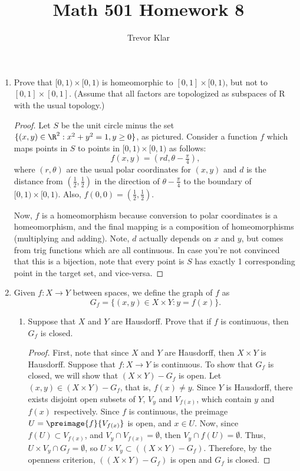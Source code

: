 \documentclass[letterpaper]{article}
\title{Math 501 \linebreak
Homework 8}
\author{Trevor Klar}
\begin{document}
\maketitle

\begin{enumerate}
\item Prove that $[0,1)\times[0,1)$ is homeomorphic to $[0,1]\times[0,1)$, but not to $[0,1]\times[0,1]$. (Assume that all factors
are topologized as subspaces of R with the usual topology.)

\begin{proof}
Let $S$ be the unit circle minus the set $\{(x,y)\in\R^2: x^2+y^2=1, y\geq0\}$, as pictured. Consider a function $f$ which maps points in $S$ to points in $[0,1)\times[0,1)$ as follows:
$$f(x,y)=\left(rd,\theta-\tfrac{\pi}{4}\right),$$
where $(r, \theta)$ are the usual polar coordinates for  $(x,y)$ and $d$ is the distance from $\left(\frac{1}{2}, \frac{1}{2}\right)$ in the direction of $\theta-\frac{\pi}{4}$ to the boundary of $[0,1)\times[0,1)$. Also, $f(0,0)=(\frac{1}{2},\frac{1}{2})$. 

\mbox{} \linebreak
\mbox{} \linebreak
\mbox{} \linebreak
\mbox{} \linebreak
\mbox{} \linebreak
\mbox{} \linebreak

Now, $f$ is a homeomorphism because conversion to polar coordinates is a homeomorphism, and the final mapping is a composition of homeomorphisms (multiplying and adding). Note, $d$ actually depends on $x$ and $y$, but comes from trig functions which are all continuous. In case you're not convinced that this is a bijection, note that every point is $S$ has exactly 1 corresponding point in the target set, and vice-versa. 
\end{proof}

\item Given $f : X \to Y$ between spaces, we define the graph of $f$ as
$$G_f = \{(x, y) \in X \times Y : y = f(x)\}.$$
\begin{enumerate}
\item Suppose that $X$ and $Y$ are Hausdorff. Prove that if $f$ is continuous, then $G_f$ is closed.
\begin{proof}
First, note that since $X$ and $Y$ are Hausdorff, then $X\times Y$ is Hausdorff. Suppose that $f : X \to Y$ is continuous. To show that $G_f$ is closed, we will show that $(X\times Y)-G_f$ is open. Let $(x,y)\in (X\times Y)-G_f$, that is, $f(x)\neq y$. Since $Y$ is Hausdorff, there exists disjoint open subsets of $Y$, $V_y$ and $V_{f(x)}$, which contain $y$ and $f(x)$ respectively. Since $f$ is continuous, the preimage $U=\preimage{f}{V_{f(x)}}$ is open, and $x\in U$. Now, since $f(U)\subset V_{f(x)}$, and $V_y\cap V_{f(x)}=\emptyset$, then $V_y\cap f(U)=\emptyset$. Thus, $U\times V_y \cap G_f=\emptyset$, so $U\times V_y \subset ((X\times Y)-G_f)$. Therefore, by the openness criterion, $((X\times Y)-G_f)$ is open and $G_f$ is closed. 
\end{proof}


\end{enumerate}
\end{enumerate}
\end{document}
